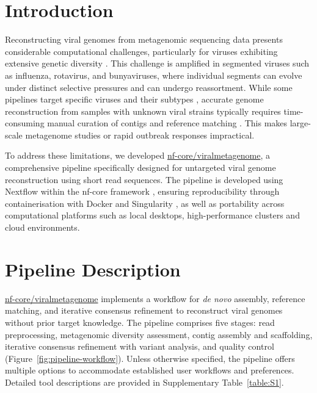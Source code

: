 
\section{Introduction}
Reconstructing viral genomes from metagenomic sequencing data presents considerable computational challenges, particularly for viruses exhibiting extensive genetic diversity \citep{Baaijens2017-hw,Meleshko2021-gb}. This challenge is amplified in segmented viruses such as influenza, rotavirus, and bunyaviruses, where individual segments can evolve under distinct selective pressures and can undergo reassortment. While some pipelines target specific viruses and their subtypes \citep{Shepard2016-uh}, accurate genome reconstruction from samples with unknown viral strains typically requires time-consuming manual curation of contigs and reference matching \citep{de_Vries2021-po}. This makes large-scale metagenome studies or rapid outbreak responses impractical.

To address these limitations, we developed \href{https://github.com/nf-core/viralmetagenome}{nf-core/\allowbreak viralmetagenome}, a comprehensive pipeline specifically designed for untargeted viral genome reconstruction using short read sequences. The pipeline is developed using Nextflow \citep{Di-Tommaso2017-nz} within the nf-core framework \citep{Langer2025-va}, ensuring reproducibility through containerisation with Docker \citep{Merkel2014-hn} and Singularity \citep{Kurtzer2017-iw}, as well as portability across computational platforms such as local desktops, high-performance clusters and cloud environments.

\section{Pipeline Description}
\href{https://github.com/nf-core/viralmetagenome}{nf-core/viralmetagenome} implements a workflow for \textit{de novo} assembly, reference matching, and iterative consensus refinement to reconstruct viral genomes without prior target knowledge. The pipeline comprises five stages: read preprocessing, metagenomic diversity assessment, contig assembly and scaffolding, iterative consensus refinement with variant analysis, and quality control (Figure~\ref{fig:pipeline-workflow}). Unless otherwise specified, the pipeline offers multiple options to accommodate established user workflows and preferences. Detailed tool descriptions are provided in Supplementary Table~\ref{table:S1}.

